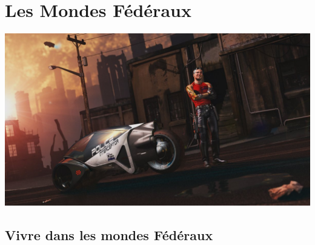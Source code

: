 \part{Les Mondes Fédéraux}

\begin{center}
\includegraphics[scale=0.38]{Img/sunset}
\end{center}

\chapter{Vivre dans les mondes Fédéraux}

